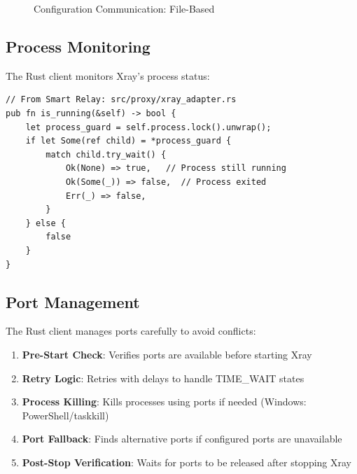 \begin{figure}[h]
    \centering
    \caption{Configuration Communication: File-Based}
\end{figure}

\subsection{Process Monitoring}

The Rust client monitors Xray's process status:

\begin{verbatim}
// From Smart Relay: src/proxy/xray_adapter.rs
pub fn is_running(&self) -> bool {
    let process_guard = self.process.lock().unwrap();
    if let Some(ref child) = *process_guard {
        match child.try_wait() {
            Ok(None) => true,   // Process still running
            Ok(Some(_)) => false,  // Process exited
            Err(_) => false,
        }
    } else {
        false
    }
}
\end{verbatim}

\subsection{Port Management}

The Rust client manages ports carefully to avoid conflicts:

\begin{enumerate}
    \item \textbf{Pre-Start Check}: Verifies ports are available before starting Xray
    \item \textbf{Retry Logic}: Retries with delays to handle TIME\_WAIT states
    \item \textbf{Process Killing}: Kills processes using ports if needed (Windows: PowerShell/taskkill)
    \item \textbf{Port Fallback}: Finds alternative ports if configured ports are unavailable
    \item \textbf{Post-Stop Verification}: Waits for ports to be released after stopping Xray
\end{enumerate}

